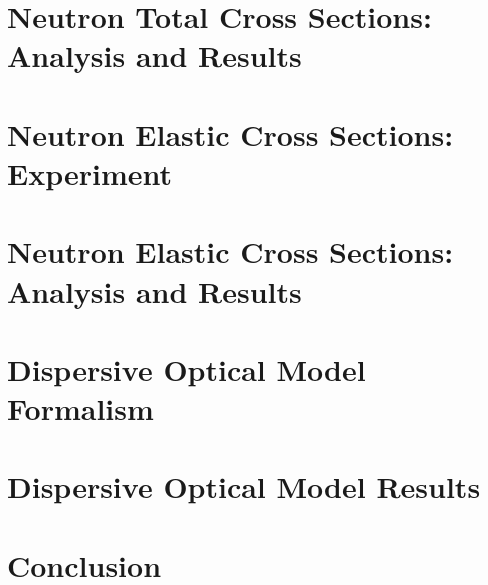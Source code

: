 \documentclass[twosided, 12pt]{book} %
\newcommand{\textDirectory}{text}
\begin{document}
\chapter{Neutron Total Cross Sections: Analysis and Results} \label{TCSAnalysis}


\chapter{Neutron Elastic Cross Sections: Experiment} \label{ECSExperiment}


\chapter{Neutron Elastic Cross Sections: Analysis and Results} \label{ECSAnalysis}


\chapter{Dispersive Optical Model Formalism} \label{DOMFormalism}


\chapter{Dispersive Optical Model Results}\label{DOMResults}


\chapter{Conclusion}


\clearpage %

\fancyhead{} %
\fancyhead[LE]{\MakeUppercase{ \leftmark}} %

\clearpage
{}

\singlespacing


\doublespacing

\clearpage
\end{document}

